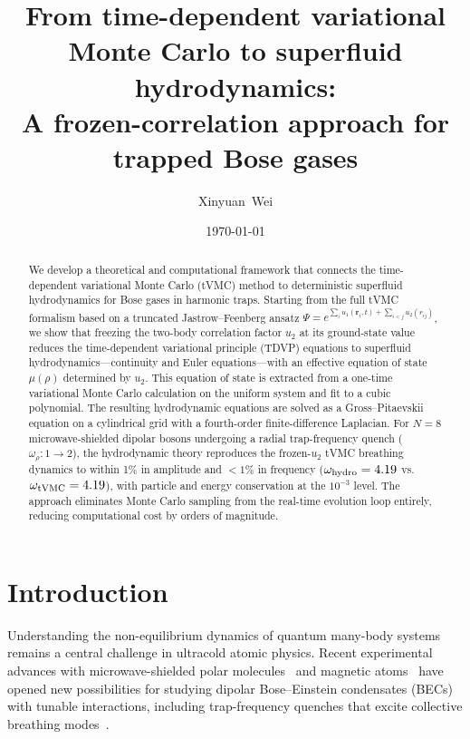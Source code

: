 \documentclass[twocolumn,superscriptaddress,aps,pra,longbibliography]{revtex4-2}
\newcommand{\br}{\mathbf{r}}
\begin{document}
\title{From time-dependent variational Monte Carlo to superfluid hydrodynamics:\\
A frozen-correlation approach for trapped Bose gases}

\author{Xinyuan~Wei}

\date{\today}

\begin{abstract}
We develop a theoretical and computational framework that connects the
time-dependent variational Monte Carlo (tVMC) method to deterministic
superfluid hydrodynamics for Bose gases in harmonic traps.  Starting from
the full tVMC formalism based on a truncated Jastrow--Feenberg ansatz
$\Psi = e^{\sum_i u_1(\br_i,t) + \sum_{i<j} u_2(r_{ij})}$, we show that
freezing the two-body correlation factor $u_2$ at its ground-state value
reduces the time-dependent variational principle (TDVP) equations to
superfluid hydrodynamics---continuity and Euler equations---with an
effective equation of state $\mu(\rho)$ determined by $u_2$.  This equation
of state is extracted from a one-time variational Monte Carlo calculation
on the uniform system and fit to a cubic polynomial.  The resulting
hydrodynamic equations are solved as a Gross--Pitaevskii equation on a
cylindrical grid with a fourth-order finite-difference Laplacian.  For
$N=8$ microwave-shielded dipolar bosons undergoing a radial trap-frequency
quench ($\omega_\rho: 1\to 2$), the hydrodynamic theory reproduces the
frozen-$u_2$ tVMC breathing dynamics to within 1\% in amplitude and
$<1\%$ in frequency ($\omega_{\rm hydro}=4.19$ vs.\
$\omega_{\rm tVMC}=4.19$), with particle and energy conservation at the
$10^{-3}$ level.  The approach eliminates Monte Carlo sampling from the
real-time evolution loop entirely, reducing computational cost by orders of
magnitude.
\end{abstract}

\maketitle

\section{Introduction}
\label{sec:intro}

Understanding the non-equilibrium dynamics of quantum many-body systems
remains a central challenge in ultracold atomic physics.  Recent
experimental advances with microwave-shielded polar
molecules~\cite{Anderegg2023} and magnetic atoms~\cite{Chomaz2023} have
opened new possibilities for studying dipolar Bose--Einstein condensates
(BECs) with tunable interactions, including trap-frequency quenches that
excite collective breathing
modes~\cite{Kinoshita2006,CastinDum1996,Pitaevskii2016}.
\end{document}
